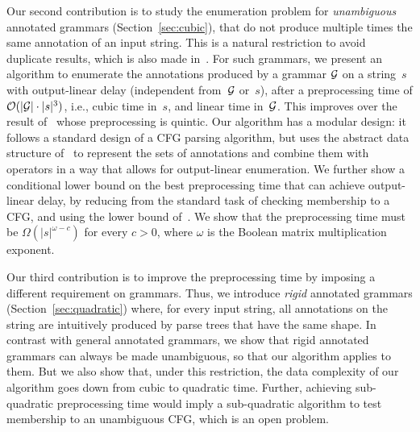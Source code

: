     Our second contribution is to study the enumeration problem for \emph{unambiguous} annotated grammars (Section~\ref{sec:cubic}),
    that do not produce multiple times the same annotation of an input string. This is a natural restriction to avoid duplicate results, %
    which is also made in~\cite{Peterfreund21}. 
  For such grammars, 
%
    we present an algorithm to enumerate the annotations produced by a grammar $\mathcal{G}$ on a string~$s$ with output-linear delay (independent from~$\mathcal{G}$ or~$s$), after a preprocessing time of $\mathcal{O}(|\mathcal{G}| \cdot |s|^3)$, i.e., cubic time in~$s$, and linear time in~$\mathcal{G}$. 
    This improves over the result of~\cite{Peterfreund21} whose preprocessing is quintic. 
    Our algorithm has a modular design: it follows a standard design of a CFG
    parsing algorithm, but uses the abstract data structure
    of~\cite{icdt2020nested}
    to represent
    the sets of annotations and combine them with operators in a way that allows for output-linear enumeration. 
    We further show a conditional lower bound on the best preprocessing time that can achieve output-linear delay, by reducing from the standard task of checking membership to a CFG, and using the lower bound of~\cite{AbboudBW18}. We show that the preprocessing time must be $\Omega(|s|^{\omega-c})$ for every $c > 0$, where $\omega$ is
    the Boolean matrix multiplication exponent.

    Our third contribution is to improve the preprocessing time by imposing a different requirement on grammars. Thus, we introduce \emph{rigid} annotated grammars (Section~\ref{sec:quadratic}) where, for every input string, all annotations on the string are intuitively produced by parse trees that have the same shape. In contrast with general annotated grammars, we show that rigid annotated grammars can always be made unambiguous, so that our algorithm applies to them. But we also show that, under this restriction, the data complexity of our algorithm goes down from cubic to quadratic time.
    Further, achieving sub-quadratic preprocessing time would imply a sub-quadratic algorithm to test membership to an unambiguous CFG, which is an open problem.


